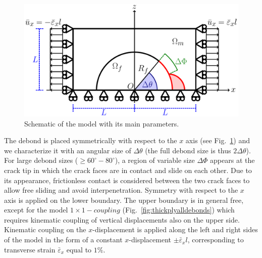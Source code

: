 \documentclass[review]{elsarticle}
\begin{document}
\begin{figure}[!h]
\centering
        \includegraphics[width=\textwidth]{RUC.pdf}

\caption{Schematic of the model with its main parameters.}\label{subfig:modelschem}
\end{figure}

The debond is placed symmetrically with respect to the $x$ axis (see Fig.~\ref{subfig:modelschem}) and we characterize it with an angular size of $\Delta\theta$ (the full debond size is thus $2\Delta\theta$). For large debond sizes ($\geq 60^{\circ}-80^{\circ}$), a region of variable size $\Delta\Phi$ appears at the crack tip in which the crack faces are in contact and slide on each other. Due to its appearance, frictionless contact is considered between the two crack faces to allow free sliding and avoid interpenetration. Symmetry with respect to the $x$ axis is applied on the lower boundary. The upper boundary is in general free, except for the model $1\times 1-coupling$ (Fig.~\ref{fig:thickplyalldebonds}) which requires kinematic coupling of vertical displacements also on the upper side. Kinematic coupling on the $x$-displacement is applied along the left and right sides of the model in the form of a constant $x$-displacement $\pm\bar{\varepsilon}_{x} l$, corresponding to transverse strain $\bar{\varepsilon}_{x}$ equal to $1\%$.
\end{document}
